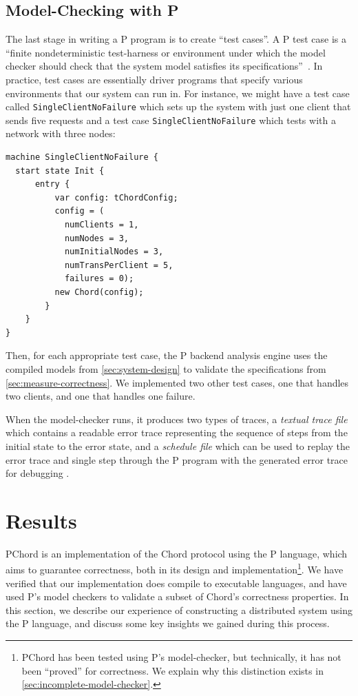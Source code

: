 \documentclass[conference]{IEEEtran}
\begin{document}
\subsection{Model-Checking with P}
The last stage in writing a P program is to create ``test cases''. A P test case is a ``finite nondeterministic test-harness or environment under which the model checker should check that the system model satisfies its specifications''~\cite{p_developers_formal_2023}. In practice, test cases are essentially driver programs that specify various environments that our system can run in. For instance, we might have a test case called \verb|SingleClientNoFailure| which sets up the system with just one client that sends five requests and a test case \verb|SingleClientNoFailure| which tests with a network with three nodes:
\begin{lstlisting}[caption=An example test case for Chord,label=test-cases]
machine SingleClientNoFailure {
  start state Init {
      entry {
          var config: tChordConfig;
          config = (
            numClients = 1, 
            numNodes = 3,
            numInitialNodes = 3,
            numTransPerClient = 5,
            failures = 0);
          new Chord(config);
        }
    }
}
\end{lstlisting}
Then, for each appropriate test case, the P backend analysis engine uses the compiled models from \autoref{sec:system-design} to validate the specifications from \autoref{sec:measure-correctness}. We implemented two other test cases, one that handles two clients, and one that handles one failure.

When the model-checker runs, it produces two types of traces, a \textit{textual trace file} which contains a readable error trace representing the sequence of steps from the initial state to the error state, and a \textit{schedule file} which can be used to replay the error trace and single step through the P program with the generated error trace for debugging \cite{p_developers_formal_2023}. 

\section{Results}
\label{sec:results}
PChord is an implementation of the Chord protocol using the P language, which aims to guarantee correctness, both in its design and implementation\footnote{PChord has been tested using P's model-checker, but technically, it has not been ``proved'' for correctness. We explain why this distinction exists in \autoref{sec:incomplete-model-checker}.}. We have verified that our implementation does compile to executable languages, and have used P's model checkers to validate a subset of Chord's correctness properties. In this section, we describe our experience of constructing a distributed system using the P language, and discuss some key insights we gained during this process.
\end{document}
